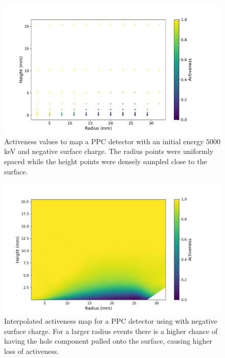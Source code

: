 \begin{figure}%
\includegraphics[trim={0cm 0.5cm 3.2cm 1.15cm},clip,width=0.95\linewidth]{ch5/figs/activenss_map_ponama_1_-0.3_5000.pdf}
\caption{Activeness values to map a PPC detector \ehd with an initial energy $5000$ keV and negative surface charge. The radius points were uniformly spaced while the height points were densely sampled close to the surface.}
\label{ch5_fig_activeness_points_neg}
\end{figure}

\begin{figure}%
\centering
\includegraphics[trim={1.0cm 0.5cm 3.2cm 1.5cm},clip,width=0.95\linewidth]{ch5/figs/activeness_map_cubic_sc=-0.3_ponama_1_5000_linear_full.png}
\caption{Interpolated activeness map for a PPC detector using \ehd with negative surface charge. For a larger radius events there is a higher chance of having the hole component pulled onto the surface, causing higher loss of activeness.}
\label{ch5_fig_activeness_map_neg}
\end{figure}

